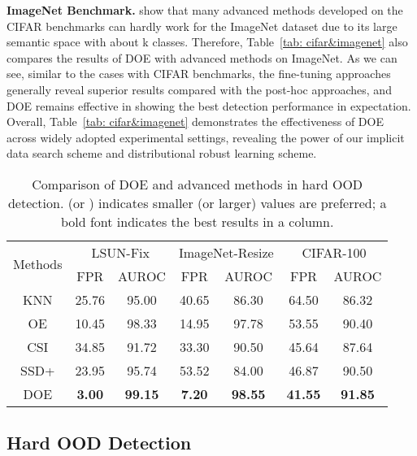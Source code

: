 \documentclass{article} \usepackage{iclr2022_conference,times}
\begin{document}
\textbf{ImageNet Benchmark.} \cite{HuangL21} show that many advanced methods developed on the CIFAR benchmarks can hardly work for the ImageNet dataset due to its large semantic space with about k classes. Therefore, Table~\ref{tab: cifar&imagenet} also compares the results of DOE with advanced methods on ImageNet. As we can see, similar to the cases with CIFAR benchmarks, the fine-tuning approaches generally reveal superior results compared with the post-hoc approaches, and DOE remains effective in showing the best detection performance in expectation. Overall, Table~\ref{tab: cifar&imagenet} demonstrates the effectiveness of DOE across widely adopted experimental settings, revealing the power of our implicit data search scheme and distributional robust learning scheme. 


\begin{table}[]
\caption{Comparison of DOE and advanced methods in hard OOD detection.  (or ) indicates smaller (or larger) values are preferred; a bold font indicates the best results in a column.} \label{tab: cifar hard}
\small
\centering
\begin{tabular}{c|cc|cc|cc}
\toprule[1.5pt]
\multirow{2}{*}{Methods} & \multicolumn{2}{c|}{LSUN-Fix}            & \multicolumn{2}{c|}{ImageNet-Resize} & \multicolumn{2}{c}{CIFAR-100}           \\
 \cline{2-7} 
 & FPR  & AUROC  & FPR  & AUROC  & FPR  & AUROC  \\
\midrule[1pt]
KNN         & 25.76 & 95.00 & 40.65 & 86.30 & 64.50 & 86.32 \\
OE          & 10.45 & 98.33 & 14.95 & 97.78 & 53.55 & 90.40 \\
CSI         & 34.85 & 91.72 & 33.30 & 90.50 & 45.64 & 87.64 \\
SSD+        & 23.95 & 95.74 & 53.52 & 84.00 & 46.87 & 90.50 \\
\hline
DOE         &  \textbf{3.00} & \textbf{99.15} &  \textbf{7.20} & \textbf{98.55} & \textbf{41.55} & \textbf{91.85}  \\
 \bottomrule[1.5pt]
\end{tabular}
\end{table}





\subsection{Hard OOD Detection} \label{sec: near OOD}
\end{document}
